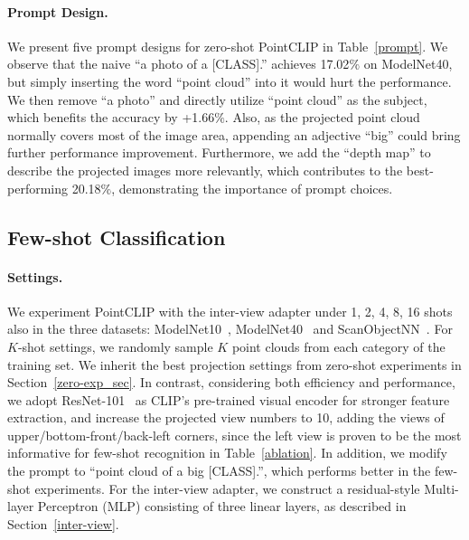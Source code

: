 \documentclass[10pt,twocolumn,letterpaper]{article}
\begin{document}
\vspace*{-8pt}
\paragraph{Prompt Design.} We present five prompt designs for zero-shot PointCLIP in Table~\ref{prompt}. We observe that the naive ``a photo of a [CLASS].'' achieves 17.02$\%$ on ModelNet40, but simply inserting the word ``point cloud'' into it would hurt the performance. We then remove ``a photo'' and directly utilize ``point cloud'' as the subject, which benefits the accuracy by +1.66$\%$. Also, as the projected point cloud normally covers most of the image area, appending an adjective ``big'' could bring further performance improvement. Furthermore, we add the ``depth map'' to describe the projected images more relevantly, which contributes to the best-performing 20.18$\%$, demonstrating the importance of prompt choices.
\label{Prompt Design}


\vspace*{1pt}
\subsection{Few-shot Classification}
\paragraph{Settings.} We experiment PointCLIP with the inter-view adapter under 1, 2, 4, 8, 16 shots also in the three datasets: ModelNet10~\cite{wu20153d}, ModelNet40~\cite{wu20153d} and ScanObjectNN~\cite{uy2019revisiting}. For $K$-shot settings, we randomly sample $K$ point clouds from each category of the training set. We inherit the best projection settings from zero-shot experiments in Section~\ref{zero-exp_sec}. In contrast, considering both efficiency and performance, we adopt ResNet-101~\cite{he2016deep} as CLIP's pre-trained visual encoder for stronger feature extraction, and increase the projected view numbers to 10, adding the views of upper/bottom-front/back-left corners, since the left view is proven to be the most informative for few-shot recognition in Table~\ref{ablation}. In addition, we modify the prompt to ``point cloud of a big [CLASS].'', which performs better in the few-shot experiments. For the inter-view adapter, we construct a residual-style Multi-layer Perceptron (MLP) consisting of three linear layers, as described in Section~\ref{inter-view}.



\vspace*{-8pt}
\end{document}

